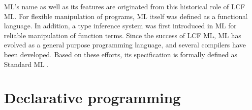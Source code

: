 \documentclass{jbook}
\newcommand{\txt}[2]{#2}
\begin{document}
	ML's name as well as its features are originated from this
historical role of LCF ML. 
	For flexible manipulation of programs, ML itself was defined as
a functional language.
	In addition, a type inference system was first introduced in ML
for reliable manipulation of function terms.
	Since the success of LCF ML, ML has evolved as a general purpose
programming language, and several compilers have been developed.
	Based on these efforts, its specification is formally defined as
Standard ML \cite{sml,sml97}.
\fi%


\section{\txt{宣言的プログラミング}{Declarative programming}}
\label{sec:tutorialDeclarative}
\end{document}
